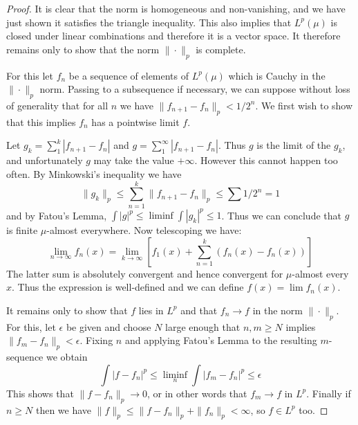 \documentclass[11pt,oneside]{amsbook}
\theoremstyle{definition}
\theoremstyle{plain}
\theoremstyle{definition}
\theoremstyle{remark}
\numberwithin{equation}{section}
\numberwithin{figure}{section}
\begin{document}
\begin{proof}
  It is clear that the norm is homogeneous and non-vanishing, and we have just shown it satisfies the triangle inequality. This also implies that $L^p(\mu)$ is closed under linear combinations and therefore it is a vector space. It therefore remains only to show that the norm $\|\cdot\|_p$ is complete.

  For this let $f_n$ be a sequence of elements of $L^p(\mu)$ which is Cauchy in the $\|\cdot\|_p$ norm. Passing to a subsequence if necessary, we can suppose without loss of generality that for all $n$ we have $\|f_{n+1}-f_n\|_p<1/2^n$. We first wish to show that this implies $f_n$ has a pointwise limit $f$.

  Let $g_k=\sum_1^k|f_{n+1}-f_n|$ and $g=\sum_1^\infty|f_{n+1}-f_n|$. Thus $g$ is the limit of the $g_k$, and unfortunately $g$ may take the value $+\infty$. However this cannot happen too often. By Minkowski's inequality we have
  \[\|g_k\|_p\leq\sum_{n=1}^k\|f_{n+1}-f_n\|_p\leq\sum1/2^n=1
  \]
  and by Fatou's Lemma, $\int|g|^p\leq\liminf\int|g_k|^p\leq1$. Thus we can conclude that $g$ is finite $\mu$-almost everywhere. Now telescoping we have:
  \[\lim_{n\to\infty} f_n(x)=\lim_{k\to\infty}\left[f_1(x)
      +\sum_{n=1}^k(f_n(x)-f_n(x))\right]
  \]
  The latter sum is absolutely convergent and hence convergent for $\mu$-almost every $x$. Thus the expression is well-defined and we can define $f(x)=\lim f_n(x)$.

  It remains only to show that $f$ lies in $L^p$ and that $f_n\to f$ in the norm $\|\cdot\|_p$. For this, let $\epsilon$ be given and choose $N$ large enough that $n,m\geq N$ implies $\|f_m-f_n\|_p<\epsilon$. Fixing $n$ and applying Fatou's Lemma to the resulting $m$-sequence we obtain
  \[\int|f-f_n|^p\leq\liminf_n\int|f_m-f_n|^p\leq\epsilon
  \]
  This shows that $\|f-f_n\|_p\to0$, or in other words that $f_m\to f$ in $L^p$. Finally if $n\geq N$ then we have $\|f\|_p\leq\|f-f_n\|_p+\|f_n\|_p<\infty$, so $f\in L^p$ too.
\end{proof}
\end{document}
